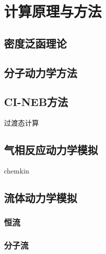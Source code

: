 \chapter{计算原理与方法}
\section{密度泛函理论}
\section{分子动力学方法}
\section{CI-NEB方法}
    过渡态计算
\section{气相反应动力学模拟}
chemkin
\section{流体动力学模拟}
    \subsection{恒流}
    \subsection{分子流}
